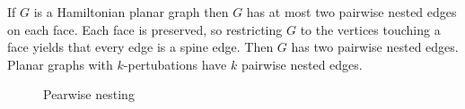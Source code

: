 If $G$ is a Hamiltonian planar graph then $G$ has at most two pairwise nested edges on each face. Each face is preserved, so restricting $G$ to the vertices touching a face yields that every edge is a spine edge. Then $G$ has two pairwise nested edges. Planar graphs with $k$-pertubations have $k$ pairwise nested edges. 

\begin{figure*}[h!]
    \centering
    
    \caption{Pearwise nesting}
\end{figure*}